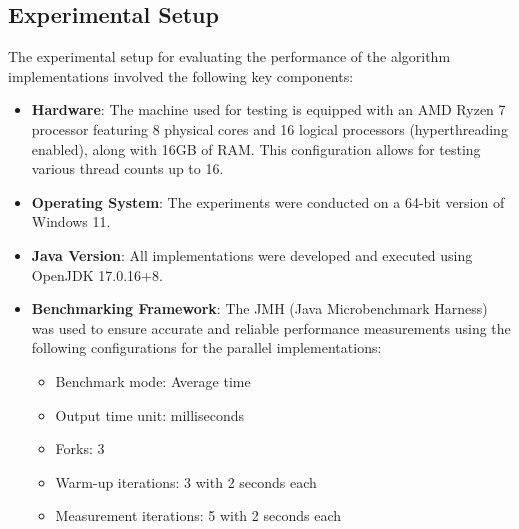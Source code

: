 \subsection{Experimental Setup}
The experimental setup for evaluating the performance of the algorithm
implementations involved the following key components:

\begin{itemize}
   \item \textbf{Hardware}: The machine used for testing is equipped with an AMD
   Ryzen 7 processor featuring 8 physical cores and 16 logical processors
   (hyperthreading enabled), along with 16GB of RAM. This configuration allows
   for testing various thread counts up to 16.
   \item \textbf{Operating System}: The experiments were conducted on a 64-bit
   version of Windows 11.
   \item \textbf{Java Version}: All implementations were developed and executed
   using OpenJDK 17.0.16+8.
   \item \textbf{Benchmarking Framework}: The JMH (Java Microbenchmark Harness)
   was used to ensure accurate and reliable performance measurements using the
   following configurations for the parallel implementations:
   \begin{itemize}
   \item Benchmark mode: Average time
   \item Output time unit: milliseconds
   \item Forks: 3
   \item Warm-up iterations: 3 with 2 seconds each
   \item Measurement iterations: 5 with 2 seconds each
   \end{itemize}
\end{itemize}